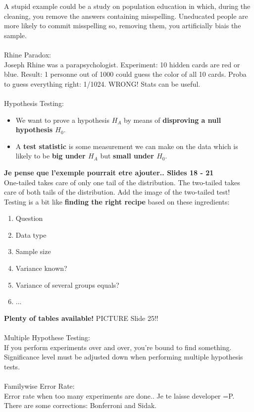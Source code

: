 \documentclass[a4paper,11pt,twoside]{article}
\begin{document}
A stupid example could be a study on population education in which, during the cleaning, you remove the answers containing misspelling. Uneducated people are more likely to commit misspelling so, removing them, you artificially biais the sample.
\\\\
Rhine Paradox: \\
Joseph Rhine was a parapsychologist. Experiment: 10 hidden cards are red or blue. Result: 1 personne out of 1000 could guess the color of all 10 cards. Proba to guess everything right: 1/1024. WRONG! Stats can be useful.
\\\\
Hypothesis Testing: \\
\begin{itemize}
 \item We want to prove a hypothesis $H_A$ by means of {\bf disproving a null hypothesis $H_0$}.
 \item A {\bf test statistic} is some measurement we can make on the data which is likely to be {\bf big under $H_A$} but {\bf small under $H_0$}.
\end{itemize}
{\huge \bf Je pense que l'exemple pourrait etre ajouter.. Slides 18 - 21} \\
One-tailed takes care of only one tail of the distribution. The two-tailed takes care of both tails of the distribution. Add the image of the two-tailed test! \\
Testing is a bit like {\bf finding the right recipe} based on these ingredients:
\begin{enumerate}
 \item Question
 \item Data type
 \item Sample size
 \item Variance known? 
 \item Variance of several groups equals?
 \item ...
\end{enumerate}
{\bf Plenty of tables available!} PICTURE Slide 25!!
\\\\
Multiple Hypothese Testing: \\
If you perform experiments over and over, you're bound to find something. Significance level must be adjusted down when performing multiple hypothesis tests. 
\\\\
Familywise Error Rate: \\
Error rate when too many experiments are done.. Je te laisse developer =P. There are some corrections: Bonferroni and Sidak.
\end{document}
